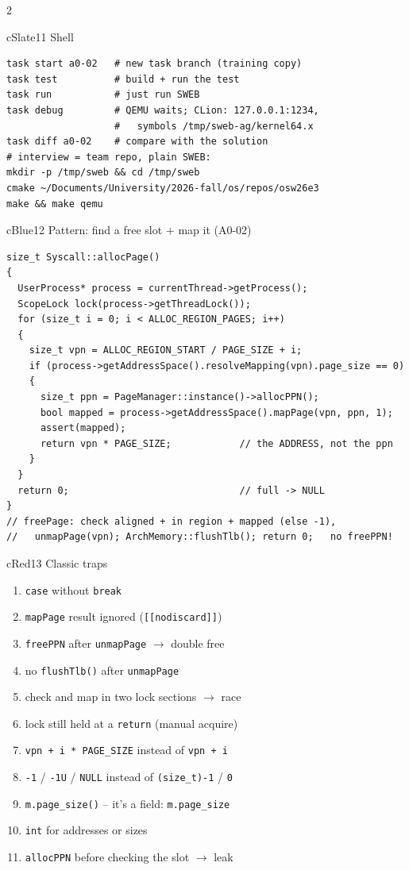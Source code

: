 \documentclass[10pt,a4paper,landscape]{article}
\newcommand{\cc}[1]{\texttt{#1}}   %
\begin{document}
\begin{multicols}{2}
\begin{csec}{cSlate}{11 \quad Shell}
\begin{lstlisting}[style=shell]
task start a0-02   # new task branch (training copy)
task test          # build + run the test
task run           # just run SWEB
task debug         # QEMU waits; CLion: 127.0.0.1:1234,
                   #   symbols /tmp/sweb-ag/kernel64.x
task diff a0-02    # compare with the solution
# interview = team repo, plain SWEB:
mkdir -p /tmp/sweb && cd /tmp/sweb
cmake ~/Documents/University/2026-fall/os/repos/osw26e3
make && make qemu
\end{lstlisting}
\end{csec}

\begin{csec}{cBlue}{12 \quad Pattern: find a free slot + map it (A0-02)}
\begin{lstlisting}
size_t Syscall::allocPage()
{
  UserProcess* process = currentThread->getProcess();
  ScopeLock lock(process->getThreadLock());
  for (size_t i = 0; i < ALLOC_REGION_PAGES; i++)
  {
    size_t vpn = ALLOC_REGION_START / PAGE_SIZE + i;
    if (process->getAddressSpace().resolveMapping(vpn).page_size == 0)
    {
      size_t ppn = PageManager::instance()->allocPPN();
      bool mapped = process->getAddressSpace().mapPage(vpn, ppn, 1);
      assert(mapped);
      return vpn * PAGE_SIZE;            // the ADDRESS, not the ppn
    }
  }
  return 0;                              // full -> NULL
}
// freePage: check aligned + in region + mapped (else -1),
//   unmapPage(vpn); ArchMemory::flushTlb(); return 0;   no freePPN!
\end{lstlisting}
\end{csec}

\begin{csec}{cRed}{13 \quad Classic traps}
\begin{enumerate}[label=\textbf{\arabic*}, leftmargin=1.3em]
  \item \cc{case} without \cc{break}
  \item \cc{mapPage} result ignored (\cc{[[nodiscard]]})
  \item \cc{freePPN} after \cc{unmapPage} $\to$ double free
  \item no \cc{flushTlb()} after \cc{unmapPage}
  \item check and map in two lock sections $\to$ race
  \item lock still held at a \cc{return} (manual acquire)
  \item \cc{vpn + i * PAGE\_SIZE} instead of \cc{vpn + i}
  \item \cc{-1} / \cc{-1U} / \cc{NULL} instead of \cc{(size\_t)-1} / \cc{0}
  \item \cc{m.page\_size()} -- it's a field: \cc{m.page\_size}
  \item \cc{int} for addresses or sizes
  \item \cc{allocPPN} before checking the slot $\to$ leak
\end{enumerate}
\end{csec}


\end{multicols}
\end{document}
